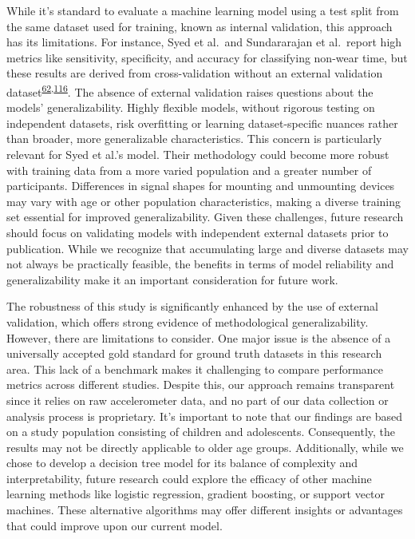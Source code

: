 \documentclass[
  9pt,
]{scrbook}
\begin{document}
While it's standard to evaluate a machine learning model using a test
split from the same dataset used for training, known as internal
validation, this approach has its limitations. For instance, Syed et
al.~and Sundararajan et al.~report high metrics like sensitivity,
specificity, and accuracy for classifying non-wear time, but these
results are derived from cross-validation without an external validation
dataset\textsuperscript{\protect\hyperlink{ref-sundararajan_sleep_2021}{62},\protect\hyperlink{ref-syed_evaluating_2020}{116}}.
The absence of external validation raises questions about the models'
generalizability. Highly flexible models, without rigorous testing on
independent datasets, risk overfitting or learning dataset-specific
nuances rather than broader, more generalizable characteristics. This
concern is particularly relevant for Syed et al.'s model. Their
methodology could become more robust with training data from a more
varied population and a greater number of participants. Differences in
signal shapes for mounting and unmounting devices may vary with age or
other population characteristics, making a diverse training set
essential for improved generalizability. Given these challenges, future
research should focus on validating models with independent external
datasets prior to publication. While we recognize that accumulating
large and diverse datasets may not always be practically feasible, the
benefits in terms of model reliability and generalizability make it an
important consideration for future work.

The robustness of this study is significantly enhanced by the use of
external validation, which offers strong evidence of methodological
generalizability. However, there are limitations to consider. One major
issue is the absence of a universally accepted gold standard for ground
truth datasets in this research area. This lack of a benchmark makes it
challenging to compare performance metrics across different studies.
Despite this, our approach remains transparent since it relies on raw
accelerometer data, and no part of our data collection or analysis
process is proprietary. It's important to note that our findings are
based on a study population consisting of children and adolescents.
Consequently, the results may not be directly applicable to older age
groups. Additionally, while we chose to develop a decision tree model
for its balance of complexity and interpretability, future research
could explore the efficacy of other machine learning methods like
logistic regression, gradient boosting, or support vector machines.
These alternative algorithms may offer different insights or advantages
that could improve upon our current model.
\end{document}
